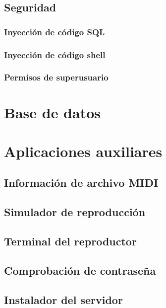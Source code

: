 \subsection{Seguridad}
\subsubsection{Inyección de código SQL}
\subsubsection{Inyección de código shell}
\subsubsection{Permisos de superusuario}


\section{Base de datos}

\section{Aplicaciones auxiliares}
\subsection{Información de archivo MIDI}
\subsection{Simulador de reproducción}
\label{subsec:simulador_reproduccion}
\subsection{Terminal del reproductor}
\subsection{Comprobación de contraseña}
\subsection{Instalador del servidor}